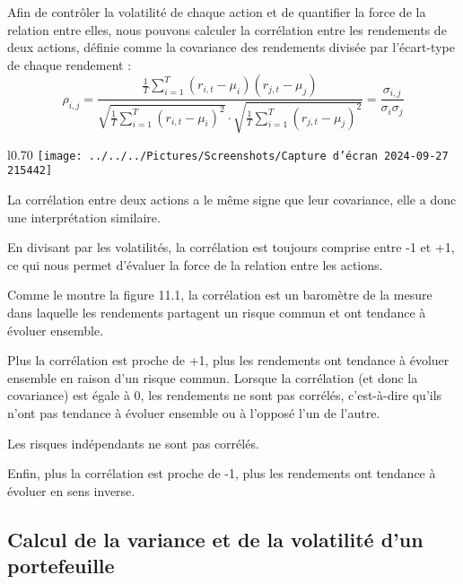\documentclass[a4paper, 12pt]{report}
\begin{document}
Afin de contrôler la volatilité de chaque action et de quantifier la force de la relation entre elles, nous pouvons calculer la corrélation entre les rendements de deux actions, définie comme la covariance des rendements divisée par l'écart-type de chaque rendement :
$$
\rho_{i,j}=\frac{\frac{1}{T}\sum_{i=1}^{T}(r_{i,t}-\mu_i)(r_{j,t}-\mu_j)}{\sqrt{\frac{1}{T}\sum_{i=1}^{T}(r_{i,t}-\mu_i)^2}\cdot\sqrt{\frac{1}{T}\sum_{i=1}^{T}(r_{j,t}-\mu_j)^2}}=\frac{\sigma_{i,j
}}{\sigma_{i}\sigma_{j}}
$$
\begin{wrapfigure}{l}{0.70\textwidth}
	\centering
\texttt{[image: ../../../Pictures/Screenshots/Capture d'écran 2024-09-27 215442]}
\end{wrapfigure}
La corrélation entre deux actions a le même signe que leur covariance, elle a donc une interprétation similaire.

En divisant par les volatilités, la corrélation est toujours comprise entre -1 et +1, ce qui nous permet d'évaluer la force de la relation entre les actions.

Comme le montre la figure 11.1, la corrélation est un baromètre de la mesure dans laquelle les rendements partagent un risque commun et ont tendance à évoluer ensemble.

Plus la corrélation est proche de +1, plus les rendements ont tendance à évoluer ensemble en raison d'un risque commun. Lorsque la corrélation (et donc la covariance) est égale à 0, les rendements ne sont pas corrélés, c'est-à-dire qu'ils n'ont pas tendance à évoluer ensemble ou à l'opposé l'un de l'autre.

Les risques indépendants ne sont pas corrélés.

Enfin, plus la corrélation est proche de -1, plus les rendements ont tendance à évoluer en sens inverse.

\subsection{Calcul de la variance et de la volatilité d'un portefeuille}
\end{document}
